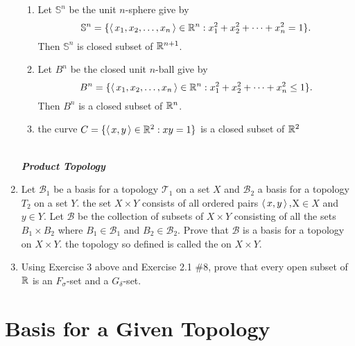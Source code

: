 \documentclass[10pt,a4paper]{report}
\newcommand{\SPECIAL}[1]{\begin{center}
	{\Large \textbf{\textit{\\#1}} }
\end{center}
}
\newcommand{\BB}{\mathcal{B}}
\newcommand{\TT}{\mathcal{T}}
\newcommand{\SSS}{\mathbb{S}}
\begin{document}
\begin{enumerate}
\begin{enumerate}[label=(\roman*)]
	\item Let $\SSS^n$ be the unit $n$-sphere give by \[ \SSS^n = \{\ABRACKET{x_1,x_2,\dots,x_n} \in \R^n : x_1^2+x_2^2+\cdots+x_n^2 = 1\}.\]  Then $\SSS^n$ is closed subset of $\mathbb{R}^{n+1}$.
	
	\item Let $B^n$ be the closed unit $n$-ball give by \[ B^n = \{\left \langle\, x_1,x_2,\dots,x_n \,\right \rangle \in \mathbb{R}^n : x_1^2+x_2^2+\cdots+x_n^2 \le 1\}.\]  Then $B^n$ is a closed subset of $\mathbb{R}^n$.
	
	\item the curve $C = \{\left \langle\, x,y \,\right \rangle\in\mathbb{R}^2 : xy=1\}$ is a closed subset of $\mathbb{R}^2$

\end{enumerate}

\SPECIAL{Product Topology}
\item Let $\BB_1$ be a basis for a topology $\TT_1$ on a set $X$ and $\BB_2$ a basis for a topology $T_2$ on a set $Y$.  the set $X \times Y$ consists of all ordered pairs $\left \langle\, x,y \,\right \rangle, $X$ \in X$ and $y \in Y$.  Let $\BB$ be the collection of subsets of $X \times Y$ consisting of all the sets $B_1 \times B_2$ where $B_1 \in \BB_1$ and $B_2 \in \BB_2$.  Prove that $\BB$ is a basis for a topology on $X \times Y$.  the topology so defined is called the  on $X \times Y$.

\item Using Exercise 3 above and Exercise 2.1 \#8, prove that every open subset of $\mathbb{R}$ is an $F_\sigma$-set and a $G_\delta$-set.
\end{enumerate} %

\section{Basis for a Given Topology}
\end{document}
